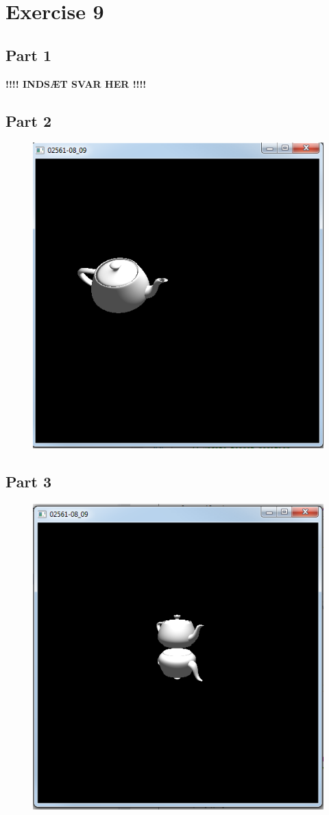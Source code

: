\documentclass[11pt]{article}
\begin{document}
\section{Exercise 9}
\subsection{Part 1}
\textbf{!!!! INDSÆT SVAR HER !!!!}

\subsection{Part 2}
\begin{figure}[H]
	\centering
	\includegraphics[width=0.5\linewidth]{images/e09p2}
	\label{fig:e09p2}
\end{figure}

\subsection{Part 3}
\begin{figure}[H]
	\centering
	\includegraphics[width=0.5\linewidth]{images/e09p3}
	\label{fig:e09p3}
\end{figure}
\end{document}
